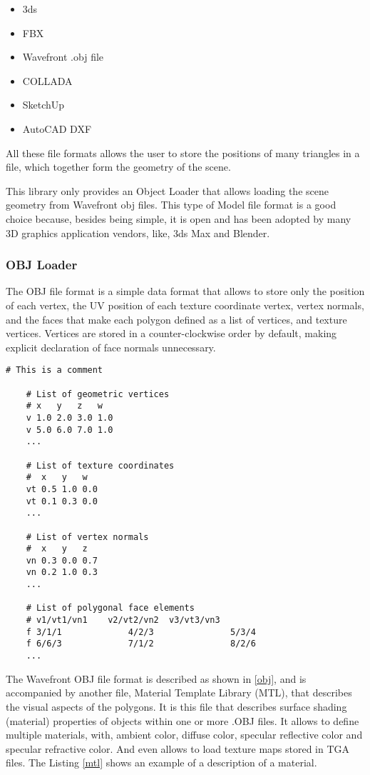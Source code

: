 \begin{itemize}
	\item 3ds
	\item FBX
	\item Wavefront .obj file
	\item COLLADA
	\item SketchUp
	\item AutoCAD DXF
\end{itemize}

\par
All these file formats allows the user to store the positions of many triangles in a file, which together form the geometry of the scene.

\par
This library only provides an Object Loader that allows loading the scene geometry from Wavefront obj files.
This type of Model file format is a good choice because, besides being simple, it is open and has been adopted by many 3D graphics application vendors, like, 3ds Max and Blender.

\subsubsection{OBJ Loader}

\par
The OBJ file format is a simple data format that allows to store only the position of each vertex, the UV position of each texture coordinate vertex, vertex normals, and the faces that make each polygon defined as a list of vertices, and texture vertices.
Vertices are stored in a counter-clockwise order by default, making explicit declaration of face normals unnecessary.

\begin{lstlisting}[caption={.OBJ file format}, captionpos=b, label=obj]
	# This is a comment

	# List of geometric vertices
	# x   y   z   w
	v 1.0 2.0 3.0 1.0
	v 5.0 6.0 7.0 1.0
	...
	
	# List of texture coordinates
	#  x   y   w
	vt 0.5 1.0 0.0
	vt 0.1 0.3 0.0
	...
	
	# List of vertex normals
	#  x   y   z
	vn 0.3 0.0 0.7
	vn 0.2 1.0 0.3
	...
	
	# List of polygonal face elements
	# v1/vt1/vn1	v2/vt2/vn2	v3/vt3/vn3
	f 3/1/1				4/2/3				5/3/4
	f 6/6/3				7/1/2				8/2/6
	...
\end{lstlisting}

\par
The Wavefront OBJ file format is described as shown in \ref{obj}, and is accompanied by another file, Material Template Library (MTL), that describes the visual aspects of the polygons.
It is this file that describes surface shading (material) properties of objects within one or more .OBJ files.
It allows to define multiple materials, with, ambient color, diffuse color, specular reflective color and specular refractive color.
And even allows to load texture maps stored in TGA files.
The Listing \ref{mtl} shows an example of a description of a material.

